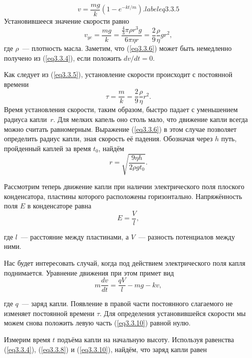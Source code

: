 \begin{equation}
v=\frac{mg }{k}\left(1-e^{-kt/m}\right).
label{eq3.3.5}
\end{equation}
Установившееся значение скорости равно
\begin{equation}
v_{yc}=\frac{mg }{k}=\frac{\frac 43 \pi\rho r^3g }{6\pi\eta r}=\frac29\frac{\rho}{\eta}g r^2,
\label{eq3.3.6}
\end{equation}
где $\rho$~--- плотность масла. Заметим, что (\ref{eq3.3.6}) может быть немедленно получено из (\ref{eq3.3.4}), если положить $dv/dt=0$.

Как следует из (\ref{eq3.3.5}), установление скорости происходит с постоянной времени
\begin{equation}
\tau=\frac{m}{k}=\frac 29 \frac{\rho}{\eta}r^2.
\label{eq3.3.7}
\end{equation}
Время установления скорости, таким образом, быстро падает с уменьшением радиуса капли~$r$. Для мелких капель оно столь мало, что движение капли всегда можно считать равномерным. Выражение (\ref{eq3.3.6}) в этом случае позволяет определить радиус капли, зная скорость её падения. Обозначая через $h$ путь, пройденный каплей за время $t_0$, найдём
\begin{equation}
r=\sqrt{\frac{9\eta h}{2\rho g t_0}}.
\label{eq3.3.8}
\end{equation}

Рассмотрим теперь движение капли при наличии электрического поля плоского конденсатора, пластины которого расположены горизонтально. Напряжённость поля $E$ в конденсаторе равна
\begin{equation}
E=\frac{V}{l},
\label{eq3.3.9}
\end{equation}

где $l$~--- расстояние между пластинами, а $V$~--- разность потенциалов между ними.

Нас будет интересовать случай, когда под действием электрического поля капля поднимается. Уравнение движения при этом примет вид
\begin{equation}
m\frac{dv}{dt}=\frac{qV}{l}-mg -kv,
\label{eq3.3.10}
\end{equation}

где $q$~--- заряд капли. Появление в правой части постоянного слагаемого не изменяет постоянной времени $\tau$. Для
определения установившейся скорости мы можем снова положить левую часть (\ref{eq3.3.10}) равной нулю.

Измерим время $t$ подъёма капли на начальную высоту. Используя равенства (\ref{eq3.3.4}), (\ref{eq3.3.8}) и (\ref{eq3.3.10}), найдём, что заряд капли равен

